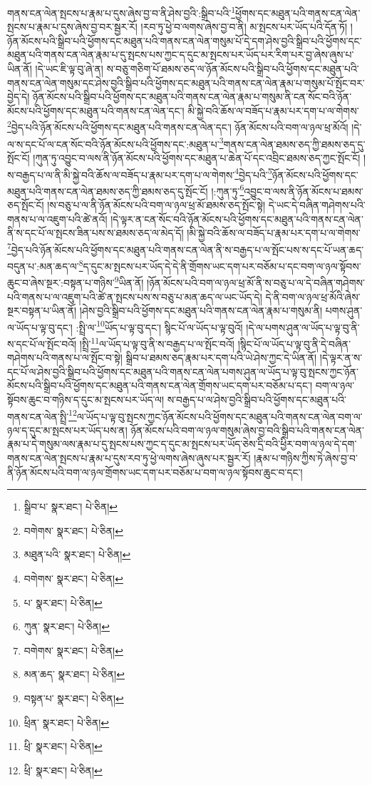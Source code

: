 གནས་ངན་ལེན་སྤངས་པ་རྣམ་པ་དུས་ཞེས་བྱ་བ་ནི་ཤེས་བྱའི་:སྒྲིབ་པའི་\footnote{སྒྲིབ་པ་  སྣར་ཐང་།  པེ་ཅིན། }ཕྱོགས་དང་མཐུན་པའི་གནས་ངན་ལེན་སྤངས་པ་རྣམ་པ་དུས་ཞེས་བྱ་བར་སྦྱར་རོ། །རབ་ཏུ་ཕྱེ་བ་ལགས་ཞེས་བྱ་བ་ནི། མ་སྤངས་པར་ཡོད་པའི་དོན་ཏོ། །ཉོན་མོངས་པའི་སྒྲིབ་པའི་ཕྱོགས་དང་མཐུན་པའི་གནས་ངན་ལེན་གསུམ་པོ་དེ་དག་ཤེས་བྱའི་སྒྲིབ་པའི་ཕྱོགས་དང་མཐུན་པའི་གནས་ངན་ལེན་རྣམ་པ་དུ་སྤངས་པས་ཀྱང་ད་དུང་མ་སྤངས་པར་ཡོད་པར་རིག་པར་བྱ་ཞེས་ཞུས་པ་ཡིན་ནོ། །དེ་ཡང་ཇི་ལྟ་བུ་ཞེ་ན། ས་བཅུ་གཅིག་པོ་ཐམས་ཅད་ལ་ཉོན་མོངས་པའི་སྒྲིབ་པའི་ཕྱོགས་དང་མཐུན་པའི་གནས་ངན་ལེན་གསུམ་དང་ཤེས་བྱའི་སྒྲིབ་པའི་ཕྱོགས་དང་མཐུན་པའི་གནས་ངན་ལེན་རྣམ་པ་གསུམ་པོ་སྤོང་བར་བྱེད་དེ། ཉོན་མོངས་པའི་སྒྲིབ་པའི་ཕྱོགས་དང་མཐུན་པའི་གནས་ངན་ལེན་རྣམ་པ་གསུམ་ནི་ངན་སོང་བའི་ཉོན་མོངས་པའི་ཕྱོགས་དང་མཐུན་པའི་གནས་ངན་ལེན་དང་། མི་སྐྱེ་བའི་ཆོས་ལ་བཟོད་པ་རྣམ་པར་དག་པ་ལ་གེགས་\footnote{བགེགས་  སྣར་ཐང་།  པེ་ཅིན། }བྱེད་པའི་ཉོན་མོངས་པའི་ཕྱོགས་དང་མཐུན་པའི་གནས་ངན་ལེན་དང་། ཉོན་མོངས་པའི་བག་ལ་ཉལ་ཕྲ་མོའོ། །དེ་ལ་ས་དང་པོ་ལ་ངན་སོང་བའི་ཉོན་མོངས་པའི་ཕྱོགས་དང་:མཐུན་པ་\footnote{མཐུན་པའི་  སྣར་ཐང་།  པེ་ཅིན། }གནས་ངན་ལེན་ཐམས་ཅད་ཀྱི་ཐམས་ཅད་དུ་སྤོང་ངོ། །ཀུན་ཏུ་འབྱུང་བ་ལས་ནི་ཉོན་མོངས་པའི་ཕྱོགས་དང་མཐུན་པ་ཆེན་པོ་དང་འབྲིང་ཐམས་ཅད་ཀྱང་སྤོང་ངོ། །ས་བརྒྱད་པ་ལ་ནི་མི་སྐྱེ་བའི་ཆོས་ལ་བཟོད་པ་རྣམ་པར་དག་པ་ལ་གེགས་\footnote{བགེགས་  སྣར་ཐང་།  པེ་ཅིན། }བྱེད་པའི་\footnote{པ་  སྣར་ཐང་།  པེ་ཅིན། }ཉོན་མོངས་པའི་ཕྱོགས་དང་མཐུན་པའི་གནས་ངན་ལེན་ཐམས་ཅད་ཀྱི་ཐམས་ཅད་དུ་སྤོང་ངོ། །:ཀུན་ཏུ་\footnote{ཀུན་  སྣར་ཐང་།  པེ་ཅིན། }འབྱུང་བ་ལས་ནི་ཉོན་མོངས་པ་ཐམས་ཅད་སྤོང་ངོ། །ས་བཅུ་པ་ལ་ནི་ཉོན་མོངས་པའི་བག་ལ་ཉལ་ཕྲ་མོ་ཐམས་ཅད་སྤོང་སྟེ། དེ་ཡང་དེ་བཞིན་གཤེགས་པའི་གནས་པ་ལ་འཇུག་པའི་ཚེ་ནའོ། །དེ་ལྟར་ན་ངན་སོང་བའི་ཉོན་མོངས་པའི་ཕྱོགས་དང་མཐུན་པའི་གནས་ངན་ལེན་ནི་ས་དང་པོ་ལ་སྤངས་ཟིན་པས་ས་ཐམས་ཅད་ལ་མེད་དོ། །མི་སྐྱེ་བའི་ཆོས་ལ་བཟོད་པ་རྣམ་པར་དག་པ་ལ་གེགས་\footnote{བགེགས་  སྣར་ཐང་།  པེ་ཅིན། }བྱེད་པའི་ཉོན་མོངས་པའི་ཕྱོགས་དང་མཐུན་པའི་གནས་ངན་ལེན་ནི་ས་བརྒྱད་པ་ལ་སྤོང་པས་ས་དང་པོ་ཡན་ཆད་བདུན་པ་:མན་ཆད་ལ་\footnote{མན་ཆད་  སྣར་ཐང་།  པེ་ཅིན། }ད་དུང་མ་སྤངས་པར་ཡོད་དེ་དེ་ནི་གྲོགས་ཡང་དག་པར་བཅོམ་པ་དང་བག་ལ་ཉལ་སྟོབས་ཆུང་བ་ཞེས་སྔར་:བསྟན་པ་གཉིས་\footnote{བསྟན་པ་  སྣར་ཐང་།  པེ་ཅིན། }ཡིན་ནོ། །ཉོན་མོངས་པའི་བག་ལ་ཉལ་ཕྲ་མོ་ནི་ས་བཅུ་པ་ལ་དེ་བཞིན་གཤེགས་པའི་གནས་པ་ལ་འཇུག་པའི་ཚེ་ན་སྤངས་པས་ས་བཅུ་པ་མན་ཆད་ལ་ཡང་ཡོད་དེ། དེ་ནི་བག་ལ་ཉལ་ཕྲ་མོའི་ཞེས་སྔར་བསྟན་པ་ཡིན་ནོ། །ཤེས་བྱའི་སྒྲིབ་པའི་ཕྱོགས་དང་མཐུན་པའི་གནས་ངན་ལེན་རྣམ་པ་གསུམ་ནི། པགས་ཤུན་ལ་ཡོད་པ་ལྟ་བུ་དང་། :སྤྲི་ལ་\footnote{ཕྲིན་  སྣར་ཐང་།  པེ་ཅིན། }ཡོད་པ་ལྟ་བུ་དང་། སྙིང་པོ་ལ་ཡོད་པ་ལྟ་བུའོ། །དེ་ལ་པགས་ཤུན་ལ་ཡོད་པ་ལྟ་བུ་ནི་ས་དང་པོ་ལ་སྤོང་བའོ། །སྤྲི་\footnote{ཕྲི་  སྣར་ཐང་།  པེ་ཅིན། }ལ་ཡོད་པ་ལྟ་བུ་ནི་ས་བརྒྱད་པ་ལ་སྤོང་བའོ། །སྙིང་པོ་ལ་ཡོད་པ་ལྟ་བུ་ནི་དེ་བཞིན་གཤེགས་པའི་གནས་པ་ལ་སྤོང་བ་སྟེ། སྒྲིབ་པ་ཐམས་ཅད་རྣམ་པར་དག་པའི་ཡེ་ཤེས་ཀྱང་དེ་ཡིན་ནོ། །དེ་ལྟར་ན་ས་དང་པོ་ལ་ཤེས་བྱའི་སྒྲིབ་པའི་ཕྱོགས་དང་མཐུན་པའི་གནས་ངན་ལེན་པགས་ཤུན་ལ་ཡོད་པ་ལྟ་བུ་སྤངས་ཀྱང་ཉོན་མོངས་པའི་སྒྲིབ་པའི་ཕྱོགས་དང་མཐུན་པའི་གནས་ངན་ལེན་གྲོགས་ཡང་དག་པར་བཅོམ་པ་དང་། བག་ལ་ཉལ་སྟོབས་ཆུང་བ་གཉིས་ད་དུང་མ་སྤངས་པར་ཡོད་ལ། ས་བརྒྱད་པ་ལ་ཤེས་བྱའི་སྒྲིབ་པའི་ཕྱོགས་དང་མཐུན་པའི་གནས་ངན་ལེན་སྤྲི་\footnote{ཕྲི་  སྣར་ཐང་།  པེ་ཅིན། }ལ་ཡོད་པ་ལྟ་བུ་སྤངས་ཀྱང་ཉོན་མོངས་པའི་ཕྱོགས་དང་མཐུན་པའི་གནས་ངན་ལེན་བག་ལ་ཉལ་ད་དུང་མ་སྤངས་པར་ཡོད་པས་ན། ཉོན་མོངས་པའི་བག་ལ་ཉལ་གསུམ་ཞེས་བྱ་བའི་སྒྲིབ་པའི་གནས་ངན་ལེན་རྣམ་པ་དེ་གསུམ་ལས་རྣམ་པ་དུ་སྤངས་པས་ཀྱང་ད་དུང་མ་སྤངས་པར་ཡོད་ཅེས་དྲི་བའི་ཕྱིར་བག་ལ་ཉལ་དེ་དག་གནས་ངན་ལེན་སྤངས་པ་རྣམ་པ་དུས་རབ་ཏུ་ཕྱེ་ལགས་ཞེས་ཞུས་པར་སྦྱར་རོ། །རྣམ་པ་གཉིས་ཀྱིས་ཏེ་ཞེས་བྱ་བ་ནི་ཉོན་མོངས་པའི་བག་ལ་ཉལ་གྲོགས་ཡང་དག་པར་བཅོམ་པ་བག་ལ་ཉལ་སྟོབས་ཆུང་བ་དང་། 